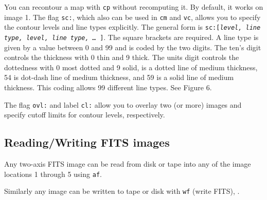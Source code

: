 You can recontour a map with {\tt cp} without recomputing it. By default, it
works on image 1. 
\smallskip
{}
\smallskip\noindent
The flag {\tt sc:}, which also can be used in {\tt cm} and {\tt vc}, allows
you to specify the contour levels and line types explicitly. The general
form is {\tt sc:[{\it level, line type, level, line type, \dots\ }]}. The
square brackets are required. A line type is given by a value 
between 0 and 99 and is coded by the two digits.  The ten's digit controls the
thickness with 0 thin and 9 thick.  The units digit controls
the dottedness with 0 most dotted and 9 solid,  is a dotted line of 
medium thickness, 54 is dot-dash line of medium thickness, and 
59 is a solid line of medium thickness. This coding allows 99 different line 
types. See Figure 6.
 
The flag {\tt ovl:} and label {\tt cl:} allow you to overlay two (or more) images
and specify cutoff limits for contour levels, respectively.
\smallskip
{}

\subsection{Reading/Writing FITS images}

Any two-axis FITS image can be read from disk or tape into 
any of the image locations 1 through 5 using {\tt af}.
\smallskip
{}

\smallskip
Similarly any image can be written to tape or disk with {\tt wf} (write FITS),
.

